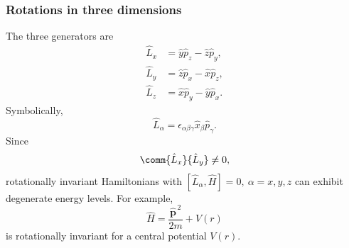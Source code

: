 \subsubsection{Rotations in three dimensions}
The three generators are
\begin{align}
 \hat L_x&=\hat y\hat p_z-\hat z\hat p_y,\\
 \hat L_y&=\hat z\hat p_x-\hat x\hat p_z,\\
 \hat L_z&=\hat x\hat p_y-\hat y\hat p_x.
\end{align}
Symbolically,
\begin{equation}
 \boxed{\hat L_\alpha
 =\epsilon_{\alpha\beta\gamma}
 \hat x_\beta\hat p_\gamma.}
\end{equation}
Since
\begin{equation}
 \comm{\hat L_x}{\hat L_y}\neq0,
\end{equation}
rotationally invariant Hamiltonians with $[\hat L_\alpha,\hat H]=0,~\alpha=x,y,z$ can exhibit degenerate energy levels. For
example,
\begin{equation}
 \hat H=\frac{\hat{\bm p}^{\,2}}{2m}+V(r)
\end{equation}
is rotationally invariant for a central potential $V(r)$.


